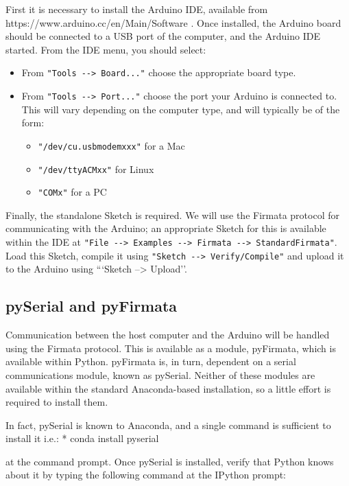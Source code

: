 \documentclass[10pt]{article}
\providecommand{\tightlist}{%
      \setlength{\itemsep}{0pt}\setlength{\parskip}{0pt}}
\begin{document}
First it is necessary to install the Arduino IDE, available from
https://www.arduino.cc/en/Main/Software . Once installed, the Arduino
board should be connected to a USB port of the computer, and the Arduino
IDE started. From the IDE menu, you should select: \begin{itemize}
\item From
\texttt{"Tools\ -\/-\textgreater{}\ Board..."} choose the appropriate
board type. \item From \texttt{"Tools\ -\/-\textgreater{}\ Port..."} choose
the port your Arduino is connected to. This will vary depending on the
computer type, and will typically be of the form: \begin{itemize}\tightlist
\item 
\texttt{"/dev/cu.usbmodemxxx"} for a Mac \item \texttt{"/dev/ttyACMxx"} for
Linux \item \texttt{"COMx"} for a PC
\end{itemize}


\end{itemize}

Finally, the standalone Sketch is required. We will use the Firmata
protocol for communicating with the Arduino; an appropriate Sketch for
this is available within the IDE at
\texttt{"File\ -\/-\textgreater{}\ Examples\ -\/-\textgreater{}\ Firmata\ -\/-\textgreater{}\ StandardFirmata"}.
Load this Sketch, compile it using
\texttt{"Sketch\ -\/-\textgreater{}\ Verify/Compile"} and upload it to
the Arduino using ```Sketch --\textgreater{} Upload''.

    \hypertarget{a.4-pyserial-and-pyfirmata}{%
\subsection{pySerial and
pyFirmata}\label{a.4-pyserial-and-pyfirmata}}

Communication between the host computer and the Arduino will be handled
using the Firmata protocol. This is available as a module, pyFirmata,
which is available within Python. pyFirmata is, in turn, dependent on a
serial communications module, known as pySerial. Neither of these
modules are available within the standard Anaconda-based installation,
so a little effort is required to install them.

In fact, pySerial is known to Anaconda, and a single command is
sufficient to install it i.e.: * conda install pyserial

at the command prompt. Once pySerial is installed, verify that Python
knows about it by typing the following command at the IPython prompt:
\end{document}
